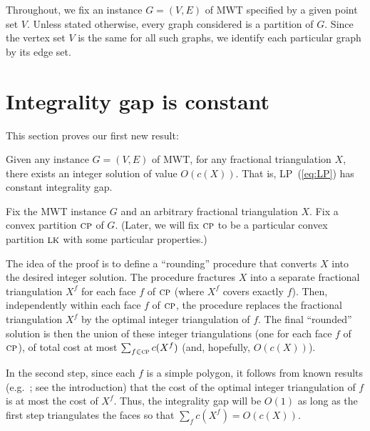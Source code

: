 \documentclass[final]{siamltex}
\newcommand{\refLP}{(\ref{eq:LP})\xspace}
\newcommand{\transposal}[2]{{#1}^{#2}}
\newcommand{\LK}{\text{\sc lk}}
\newcommand{\cost}{c}
\newcommand{\edges}{E}
\newcommand{\face}{f}
\newcommand{\graph}{G}
\newcommand{\vertices}{V}
\newcommand{\fracTriang}{X}
\begin{document}
Throughout, we fix an instance $\graph=(\vertices,\edges)$ of MWT specified by a given point set $\vertices$.
Unless stated otherwise, every graph considered is a partition of $\graph$.
Since the vertex set $\vertices$ is the same for all such graphs, we identify each particular graph by its edge set.



\section{Integrality gap is constant}  

This section proves our first new result:

\begin{theorem}\label{thm:gap}
  Given any instance $\graph=(\vertices,\edges)$ of MWT, 
  for any fractional triangulation $\fracTriang$,
  there exists an integer solution of value $O(\cost(\fracTriang))$.
  That is, LP~\refLP has constant integrality gap.
\end{theorem}
\proof
Fix the MWT instance $\graph$ and an arbitrary fractional triangulation $\fracTriang$.
Fix a convex partition $\text{\sc cp}$ of $\graph$.
(Later, we will fix $\text{\sc cp}$ to be a particular convex partition $\LK$ with some particular properties.)

The idea of the proof is to define a ``rounding'' procedure that 
converts $\fracTriang$ into the desired integer solution.
The procedure fractures $\fracTriang$ into 
a separate fractional triangulation $\transposal{\fracTriang}{\face}$ 
for each face $\face$ of $\text{\sc cp}$
(where $\transposal{\fracTriang}{\face}$ covers exactly $\face$).
Then, independently within each face $\face$ of $\text{\sc cp}$,
the procedure replaces the fractional triangulation $\fracTriang^\face$ 
by the optimal integer triangulation of $\face$.
The final ``rounded'' solution is then the union
of these integer triangulations (one for each face $\face$ of $\text{\sc cp}$),
of total cost at most $\sum_{\face\in \convPart} \cost(\transposal{\fracTriang}{\face})$ (and, hopefully, $O(\cost(\fracTriang))$).

In the second step, since each $\face$ is a simple polygon, it follows from 
known results (e.g.~\cite[Thm.~7]{dantzig1985triangulations}; see the introduction)
that the cost of the optimal integer triangulation of $\face$ is at most the cost of $\fracTriang^\face$.
Thus, the integrality gap will be $O(1)$
as long as the first step triangulates the faces so that
$\sum_\face \cost(\transposal{\fracTriang}{\face}) = O(\cost(\fracTriang))$.
\end{document}

